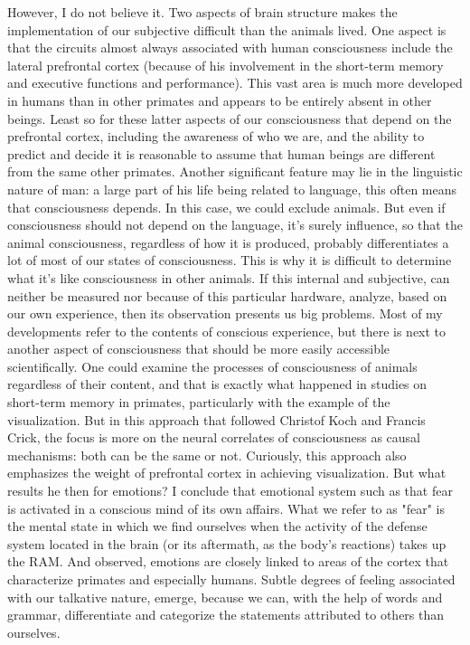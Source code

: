 However, I do not believe it.
Two aspects of brain structure makes the implementation of our subjective difficult than the animals lived.
One aspect is that the circuits almost always associated with human consciousness include the lateral prefrontal cortex (because of his involvement in the short-term memory and executive functions and performance).
This vast area is much more developed in humans than in other primates and appears to be entirely absent in other beings.
Least so for these latter aspects of our consciousness that depend on the prefrontal cortex, including the awareness of who we are, and the ability to predict and decide it is reasonable to assume that human beings are different from the same other primates.
Another significant feature may lie in the linguistic nature of man: a large part of his life being related to language, this often means that consciousness depends.
In this case, we could exclude animals.
But even if consciousness should not depend on the language, it's surely influence, so that the animal consciousness, regardless of how it is produced, probably differentiates a lot of most of our states of consciousness.
This is why it is difficult to determine what it's like consciousness in other animals.
If this internal and subjective, can neither be measured nor because of this particular hardware, analyze, based on our own experience, then its observation presents us big problems.
Most of my developments refer to the contents of conscious experience, but there is next to another aspect of consciousness that should be more easily accessible scientifically.
One could examine the processes of consciousness of animals regardless of their content, and that is exactly what happened in studies on short-term memory in primates, particularly with the example of the visualization.
But in this approach that followed Christof Koch and Francis Crick, the focus is more on the neural correlates of consciousness as causal mechanisms: both can be the same or not.
Curiously, this approach also emphasizes the weight of prefrontal cortex in achieving visualization.
But what results he then for emotions?
I conclude that emotional system such as that fear is activated in a conscious mind of its own affairs.
What we refer to as "fear" is the mental state in which we find ourselves when the activity of the defense system located in the brain (or its aftermath, as the body's reactions) takes up the RAM.
And observed, emotions are closely linked to areas of the cortex that characterize primates and especially humans.
Subtle degrees of feeling associated with our talkative nature, emerge, because we can, with the help of words and grammar, differentiate and categorize the statements attributed to others than ourselves.
